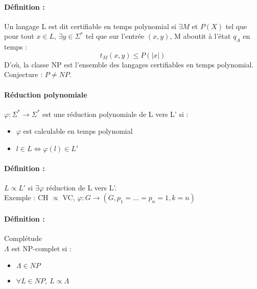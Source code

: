 \documentclass[12pt,a4paper]{report}
\begin{document}
\paragraph{Définition :\\}
Un langage L est dit certifiable en temps polynomial si $\exists M$ et $P(X)$ tel que pour tout $x \in L$, $\exists y \in \Sigma^*$ tel que sur l'entrée $(x,y)$, M aboutit à l'état $q_A$ en temps :
$$ t_M(x,y) \leqslant P(|x|) $$
D'où, la classe NP est l'ensemble des langages certifiables en temps polynomial.\\
Conjecture : $P \neq NP$.
\paragraph{Réduction polynomiale\\}
$\varphi : \Sigma^* \longrightarrow \Sigma^*$ est une réduction polynomiale de L vers L' si :
\begin{itemize}
\item $\varphi$ est calculable en temps polynomial
\item $l\in L \Longleftrightarrow \varphi(l) \in L'$
\end{itemize}
\paragraph{Définition :\\}
$L \propto L'$ si $\exists \varphi$ réduction de L vers L'.\\
Exemple : CH $ \propto$ VC, $\varphi : G \rightarrow (G,p_1=\ldots =p_n=1,k=n)$
\paragraph{Définition : }Complétude \\
$\Lambda$ est NP-complet si :
\begin{itemize}
\item $\Lambda \in NP$
\item $\forall L \in NP,\ L \propto \Lambda$
\end{itemize}
\end{document}
